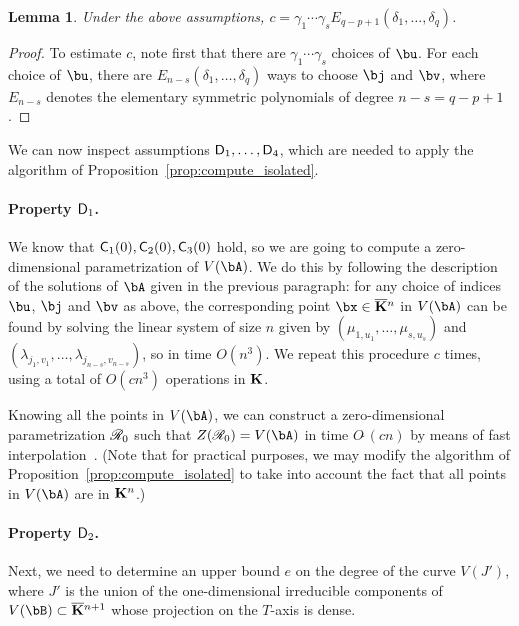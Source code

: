 \documentclass[12pt]{article}
\newtheorem{lemma}[definition]{Lemma}
\begin{document}
\begin{lemma}\label{lemma:column:c_estimate}
  Under the above assumptions, $c=\gamma_1\cdots \gamma_s
  E_{q-p+1}(\delta_1, \ldots, \delta_q)$.
\end{lemma}
\begin{proof}
To estimate $c$, note first that there are $\gamma_1\cdots
\gamma_s$ choices of $\bu$. For each choice of $\bu$, there are
$E_{n-s}(\delta_1, \ldots, \delta_q)$ ways to
choose $\bj$ and $\bv$, where $E_{n-s}$ denotes the elementary
symmetric polynomials of degree $n-s=q-p+1$.   
\end{proof}
We can now inspect assumptions $\mathsf{D}_1,\dots,\mathsf{D}_4$, which are needed
to apply the algorithm of Proposition~\ref{prop:compute_isolated}.

\paragraph{Property $\mathsf{D}_1$.} We know that $\mathsf{C}_1(0),\mathsf{C}_2(0),\mathsf{C}_3(0)$
hold, so we are going to compute a zero-dimensional parametrization of
$V(\bA)$.  We do this by following the description of the solutions of
$\bA$ given in the previous paragraph: for any choice of indices
$\bu$, $\bj$ and $\bv$ as above, the corresponding point $\bx \in
\KKbar{}^n$ in $V(\bA)$ can be found by solving the linear system of
size $n$ given by $(\mu_{1,u_1},\dots,\mu_{s,u_s})$ and
$(\lambda_{j_1,v_1},\dots,\lambda_{j_{n-s},v_{n-s}})$, so in time
$O(n^3)$. We repeat this procedure $c$ times, using a total of $O(c
n^3)$ operations in $\mathbf{K}$.

Knowing all the points in $V(\bA)$, we can construct a zero-dimensional
parametrization $\mathscr{R}_0$ such that $Z(\scrR_0)=V(\bA)$ in time
$O\tilde{~}(cn)$ by means of fast interpolation~\cite[Chapter~10]{GaGe03}.
(Note that for practical purposes, we may modify the algorithm
of Proposition~\ref{prop:compute_isolated} to take into account the
fact that all points in $V(\bA)$ are in $\mathbf{K}^n$.)

\paragraph{Property $\mathsf{D}_2$.} Next, we need to determine an upper bound 
$e$ on the degree of the curve $V(J')$, where $J'$ is the union of the
one-dimensional irreducible components of $V(\bB) \subset
\KKbar{}^{n+1}$ whose projection on the $T$-axis is dense.
\end{document}
